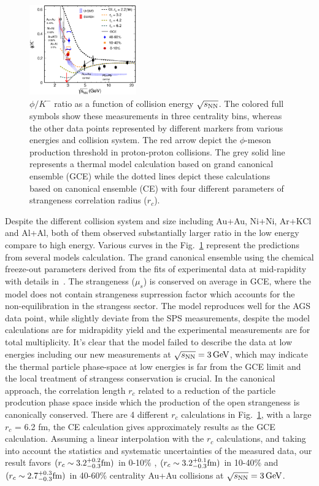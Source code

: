 \documentclass[%
 reprint,	
showpacs,
 amsmath,amssymb,
 aps,
 prc,
]{revtex4-1}
\begin{document}
\begin{figure}
\centering
\includegraphics[width=0.41\textwidth]{fig/fig4_phi_over_kminus_zoomin.eps}
  \caption{ $\phi/K^-$ ratio as a function of collision energy $\sqrt{s_{\rm NN}}$. The colored full symbols show these measurements in three centrality bins, whereas the other data points represented by different markers from various energies and collision system. The red arrow depict the $\phi$-meson production threshold in proton-proton collisions. The grey solid line represents a thermal model calculation based on grand canonical ensemble (GCE) while the dotted lines depict these calculations based on canonical ensemble (CE) with four different parameters of strangeness correlation radius ($r_c$).}
\label{fig:phi2Kratio} 
\end{figure}


Despite the different collision system and size including Au+Au, Ni+Ni, Ar+KCl and Al+Al, both of them observed substantially larger ratio in the low energy compare to high energy. Various curves in the Fig.~\ref{fig:phi2Kratio} represent the predictions from several models calculation. The grand canonical ensemble using the chemical freeze-out parameters derived from the fits of experimental data at mid-rapidity with details in~\cite{ANDRONIC2006167}. The strangeness ($\mu_s$) is conserved on average in GCE, where the model does not contain strangeness suprression factor which accounts for the non-equilibration in the strangess sector. The model reproduces well for the AGS data point, while slightly deviate from the SPS measurements, despite the model calculations are for midrapidity yield and the experimental measurements are for total multiplicity. It's clear that the model failed to describe the data at low energies including our new measurements at ${\sqrt{s_{\rm NN}} = \rm{3\,GeV}}$, which may indicate the thermal particle phase-space at low energies is far from the GCE limit and the local treatment of strangess conservation is crucial. In the canonical approach, the correlation length $r_c$ related to a reduction of the particle prodcution phase space inside which the production of the open strangeness is canonically conserved. There are 4 different $r_c$ calculations in Fig.~\ref{fig:phi2Kratio}, with a large $r_c$ = 6.2 fm, the CE calculation gives approximately results as the GCE calculation. Assuming a linear interpolation with the $r_c$ calculations, and taking into account the statistics and systematic uncertainties of the measured data, our result favors $(r_c  \sim 3.2_{-0.3}^{+0.2} \rm{fm})$ in 0-10\% , $(r_c  \sim 3.2_{-0.3}^{+0.1} \rm{fm})$ in 10-40\% and $(r_c  \sim 2.7_{-0.3}^{+0.3} \rm{fm})$ in 40-60\% centrality Au+Au collisions at ${\sqrt{s_{\rm NN}} = \rm{3\,GeV}}$.
\end{document}
